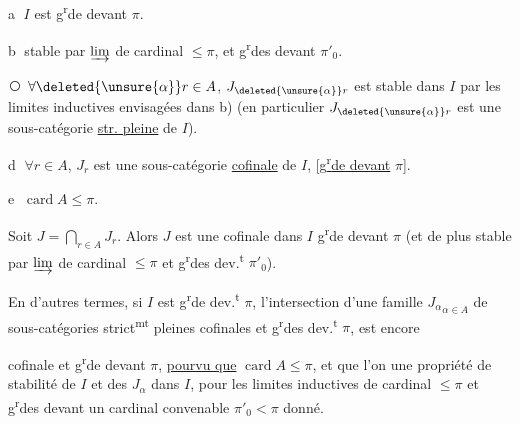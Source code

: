 \textcircled{a} $I$ est g\textsuperscript{r}de devant $\pi$.




\textcircled{b}   stable par $\varinjlim$ de
cardinal $\leq\pi$, et g\textsuperscript{r}des devant $\pi'_0$.


\textcircled{} $\forall\deleted{\unsure{\alpha}}r\in A$, $J_{\deleted{\unsure{\alpha}}r}$ est stable dans $I$ par
les limites inductives envisagées dans b)
(en particulier $J_{\deleted{\unsure{\alpha}}r}$ est une sous-catégorie
\uline{str. pleine} de $I$).

\textcircled{d} $\forall r\in A$, $J_r$ est une sous-catégorie
\uline{cofinale} de $I$, [\uline{g\textsuperscript{r}de devant} $\pi$].

\textcircled{e} $\operatorname{card}A\leq\pi$.

Soit $J=\bigcap_{r\in A}J_r$. Alors $J$ est une
cofinale dans $I$  g\textsuperscript{r}de devant $\pi$
(et de plus stable  par $\varinjlim$ de cardinal $\leq\pi$
et g\textsuperscript{r}des dev.\textsuperscript{t} $\pi'_0$).

En d'autres termes, si $I$ est g\textsuperscript{r}de
dev.\textsuperscript{t} $\pi$, l'intersection  d'une famille
$ {J_\alpha}_{\alpha\in A}$ de sous-catégories strict\textsuperscript{mt} pleines
cofinales et g\textsuperscript{r}des dev.\textsuperscript{t} $\pi$, est encore

cofinale et g\textsuperscript{r}de devant $\pi$, \uline{pourvu que}
$\operatorname{card} A\leq\pi$, et que l'on  une
propriété de stabilité de $I$ et des
$J_\alpha$ dans $I$, pour les limites inductives
de cardinal $\leq\pi$ et g\textsuperscript{r}des devant un
cardinal convenable $\pi'_0<\pi$ donné.

